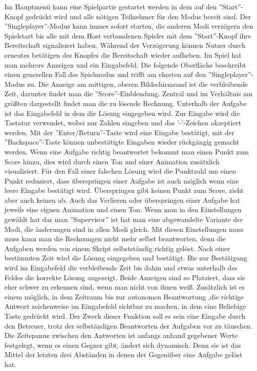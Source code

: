 Im Hauptmenü kann eine Spielpartie gestartet werden in dem auf den  ''Start''-Knopf gedrückt wird und alle nötigen Teilnehmer für den Modus bereit sind. Der ''Singleplayer''-Modus kann immer sofort starten, die anderen Modi verzögern den Spielstart bis alle mit dem Host verbundenen Spieler mit dem ''Start''-Knopf ihre Bereitschaft signalisiert haben. Während der Verzögerung können Nutzer durch erneutes betätigen des Knopfes die Bereitschaft wieder aufheben.\newline
Im Spiel hat man mehrere Anzeigen und ein Eingabefeld. Die folgende Oberfläche beschreibt einen generellen Fall des Spielmodus und trifft am ehesten auf den ''Singleplayer''-Modus zu. Die Anzeige am mittigen, oberen Bildschirmrand ist die verbleibende Zeit, darunter findet man die ''Score''-Einblendung. Zentral und im Verhältnis am größten dargestellt findet man die zu lösende Rechnung. Unterhalb der Aufgabe ist das Eingabefeld in dem die Lösung eingegeben wird. Zur Eingabe wird die Tastatur verwendet, wobei nur Zahlen eingeben und das '-'-Zeichen akzeptiert werden. Mit der ''Enter/Return''-Taste wird eine Eingabe bestätigt, mit der ''Backspace''-Taste können unbestätigte Eingaben wieder rückgängig gemacht werden. Wenn eine Aufgabe richtig beantwortet bekommt man einen Punkt zum Score hinzu, dies wird durch einen Ton und einer Animation zusätzlich visualisiert. Für den Fall einer falschen Lösung wird die Punktzahl um einen Punkt reduziert, dass überspringen einer Aufgabe ist auch möglich wenn eine leere Eingabe bestätigt wird. Überspringen gibt keinen Punkt zum Score, zieht aber auch keinen ab. Auch das Verlieren oder überspringen einer Aufgabe hat jeweils eine eignen Animation und einen Ton.\newline
Wenn man in den Einstellungen gewählt hat das man ''Supervisor'' ist hat man eine abgewandelte Variante der Modi, die änderungen sind in allen Modi gleich. Mit diesen Einstellungen muss muss kann man die Rechnungen nicht mehr selbst beantworten, denn die Aufgaben werden von einem Skript selbstständig richtig gelöst. Nach einer bestimmten Zeit wird die Lösung eingegeben und bestätigt. Bis zur Bestätigung wird im Eingabefeld die verbleibende Zeit bis dahin und etwas unterhalb des Feldes die korrekte Lösung angezeigt. Beide Anzeigen sind so Platziert, dass sie eher schwer zu erkennen sind, wenn man nicht von ihnen weiß. Zusätzlich ist es einem möglich, in dem Zeitraum bis zur autonomen Beantwortung ,die richtige Antwort zeichenweise im Eingabefeld sichtbar zu machen, in dem eine Beliebige Taste gedrückt wird. Der Zweck dieser Funktion soll es sein eine Eingabe durch den Betreuer, trotz der selbständigen Beantworten der Aufgaben vor zu täuschen.  Die Zeitspanne zwischen den Antworten ist anfangs anhand gegebener Werte festgelegt, wenn es einen Gegner gibt, ändert sich dynamisch. Denn sie ist das Mittel der letzten drei Abständen in denen der Gegenüber eine Aufgabe gelöst hat.

